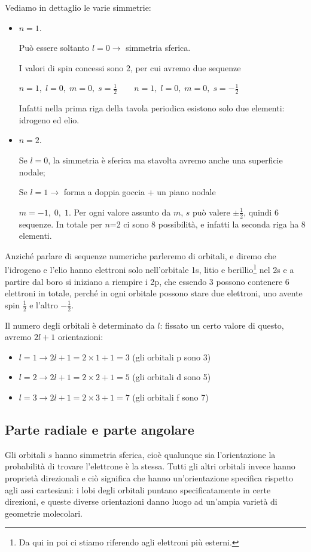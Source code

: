 \vspace{0.2cm}Vediamo in dettaglio le varie simmetrie:
\begin{itemize}
  \item $n=1$.
  
  Può essere soltanto $l=0 \rightarrow$ simmetria sferica.
  
  I valori di spin concessi sono 2, per cui avremo due sequenze

$n=1, \; l=0, \; m=0, \; s=\frac{1}{2} \qquad n=1, \; l=0, \; m=0, \; s=-\frac{1}{2}$

Infatti nella prima riga della tavola periodica esistono solo due elementi: idrogeno ed elio.
\item $n=2$.

Se $l=0$, la simmetria è sferica ma stavolta avremo anche una superficie nodale;

Se $l=1 \rightarrow$ forma a doppia goccia + un piano nodale

$m=-1, \; 0,\; 1$. Per ogni valore assunto da $m$, $s$ può valere $\pm\frac{1}{2}$, quindi 6 sequenze.
In totale per $n$=2 ci sono 8 possibilità, e infatti la seconda riga ha 8 elementi.
\end{itemize}
Anziché parlare di sequenze numeriche parleremo di orbitali, e diremo che l'idrogeno e l'elio hanno elettroni solo nell'orbitale 1s, litio e berillio\footnote{Da qui in poi ci stiamo riferendo agli elettroni più esterni.} nel 2s e a partire dal boro si iniziano a riempire i 2p, che essendo 3 possono contenere 6 elettroni in totale, perché in ogni orbitale possono stare due elettroni, uno avente spin $\frac{1}{2}$ e l'altro $-\frac{1}{2}$.

Il numero degli orbitali è determinato da $l$: fissato un certo valore di questo, avremo $2l+1$ orientazioni:
\begin{itemize}
  \item $l=1 \rightarrow 2l+1=2\times1 + 1=3$ (gli orbitali p sono 3)
  \item $l=2 \rightarrow 2l+1=2\times2 + 1=5$ (gli orbitali d sono 5)
  \item $l=3 \rightarrow 2l+1=2\times3 + 1=7$ (gli orbitali f sono 7)
\end{itemize}
\subsection{Parte radiale e parte angolare}
Gli orbitali $s$ hanno simmetria sferica, cioè qualunque sia l'orientazione la probabilità di trovare l'elettrone è la stessa. Tutti gli altri orbitali invece hanno proprietà direzionali e ciò significa che hanno un'orientazione specifica rispetto agli assi cartesiani: i lobi degli orbitali puntano specificatamente in certe direzioni, e queste diverse orientazioni danno luogo ad un'ampia varietà di geometrie molecolari.

